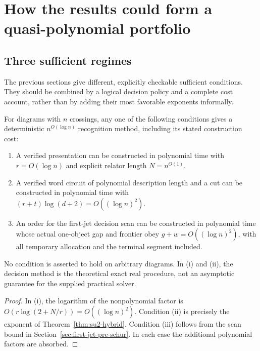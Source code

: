 \section{How the results could form a quasi-polynomial portfolio}
\label{sec:portfolio}

\subsection{Three sufficient regimes}

The previous sections give different, explicitly checkable sufficient
conditions. They should be combined by a logical decision policy and a
complete cost account, rather than by adding their most favorable
exponents informally.

\begin{corollary}
\label{cor:regimes}
For diagrams with $n$ crossings, any one of the following conditions
gives a deterministic $n^{O(\log n)}$ recognition method, including its
stated construction cost:
\begin{enumerate}[label=(\roman*)]
\item A verified presentation can be constructed in polynomial time with
      $r=O(\log n)$ and explicit relator length $N=n^{O(1)}$.
\item A verified word circuit of polynomial description length and a cut
      can be constructed in polynomial time with
      $(r+t)\log(d+2)=O((\log n)^2)$.
\item An order for the first-jet decision scan can be constructed in
      polynomial time whose actual one-object gap and frontier obey
      $g+w=O((\log n)^2)$, with all temporary allocation and the terminal
      segment included.
\end{enumerate}
No condition is asserted to hold on arbitrary diagrams. In (i) and (ii),
the decision method is the theoretical exact real procedure, not an
asymptotic guarantee for the supplied practical solver.
\end{corollary}

\begin{proof}
In (i), the logarithm of the nonpolynomial factor is
$O(r\log(2+N/r))=O((\log n)^2)$. Condition (ii) is precisely the
exponent of Theorem~\ref{thm:su2-hybrid}. Condition (iii) follows from
the scan bound in Section~\ref{sec:first-jet-pre-schur}. In each case
the additional polynomial factors are absorbed.
\end{proof}

